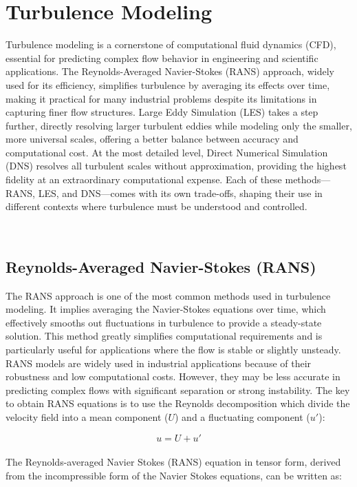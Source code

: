 \documentclass[a5paper]{sapthesis}
\begin{document}
	\section{Turbulence Modeling}
	Turbulence modeling is a cornerstone of computational fluid dynamics (CFD), essential for predicting complex flow behavior in engineering and scientific applications. The Reynolds-Averaged Navier-Stokes (RANS) approach, widely used for its efficiency, simplifies turbulence by averaging its effects over time, making it practical for many industrial problems despite its limitations in capturing finer flow structures. Large Eddy Simulation (LES) takes a step further, directly resolving larger turbulent eddies while modeling only the smaller, more universal scales, offering a better balance between accuracy and computational cost. At the most detailed level, Direct Numerical Simulation (DNS) resolves all turbulent scales without approximation, providing the highest fidelity at an extraordinary computational expense. Each of these methods—RANS, LES, and DNS—comes with its own trade-offs, shaping their use in different contexts where turbulence must be understood and controlled.
	
\	\subsection{Reynolds-Averaged Navier-Stokes (RANS)}
	The RANS approach is one of the most common methods used in turbulence modeling. It implies averaging the Navier-Stokes equations over time, which effectively smooths out fluctuations in turbulence to provide a steady-state solution. This method greatly simplifies computational requirements and is particularly useful for applications where the flow is stable or slightly unsteady. RANS models are widely used in industrial applications because of their robustness and low computational costs. However, they may be less accurate in predicting complex flows with significant separation or strong instability.
	The key to obtain RANS equations is to use the Reynolds decomposition which divide the velocity field into a mean component ($U$) and a fluctuating component ($u'$):
	
	\begin{equation}
		u = U  + u'
	\end{equation}
	\\	
	The Reynolds-averaged Navier Stokes (RANS) equation in tensor form, derived from the incompressible form of the Navier Stokes equations, can be written as:
	
\end{document}
